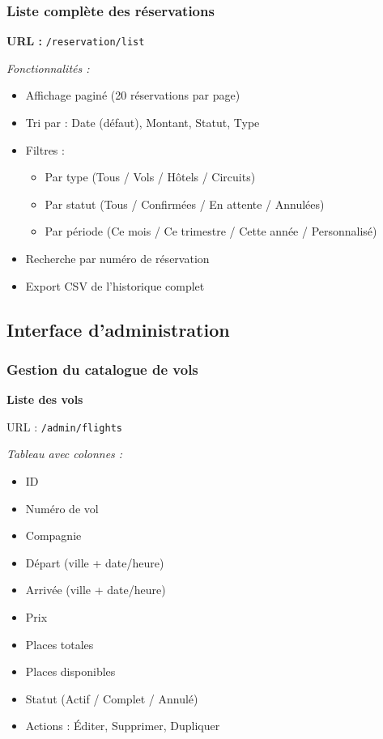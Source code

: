 \documentclass[12pt,a4paper]{report}
\begin{document}
\subsubsection{Liste complète des réservations}

\textbf{URL :} \texttt{/reservation/list}

\textit{Fonctionnalités :}
\begin{itemize}
    \item Affichage paginé (20 réservations par page)
    \item Tri par : Date (défaut), Montant, Statut, Type
    \item Filtres :
    \begin{itemize}
        \item Par type (Tous / Vols / Hôtels / Circuits)
        \item Par statut (Tous / Confirmées / En attente / Annulées)
        \item Par période (Ce mois / Ce trimestre / Cette année / Personnalisé)
    \end{itemize}
    \item Recherche par numéro de réservation
    \item Export CSV de l'historique complet
\end{itemize}

\subsection{Interface d'administration}

\subsubsection{Gestion du catalogue de vols}

\textbf{Liste des vols}

URL : \texttt{/admin/flights}

\textit{Tableau avec colonnes :}
\begin{itemize}
    \item ID
    \item Numéro de vol
    \item Compagnie
    \item Départ (ville + date/heure)
    \item Arrivée (ville + date/heure)
    \item Prix
    \item Places totales
    \item Places disponibles
    \item Statut (Actif / Complet / Annulé)
    \item Actions : Éditer, Supprimer, Dupliquer
\end{itemize}
\end{document}
